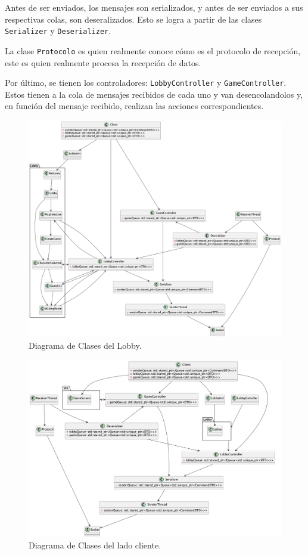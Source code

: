 \documentclass[titlepage,a4paper]{article}
\begin{document}
Antes de ser enviados, los mensajes son serializados, y antes de ser enviados a sus respectivas colas, son deseralizados. Esto se logra a partir de las clases \texttt{Serializer} y \texttt{Deserializer}.

La clase \texttt{Protocolo} es quien realmente conoce cómo es el protocolo de recepción, este es quien realmente procesa la recepción de datos. 

Por último, se tienen los controladores: \texttt{LobbyController} y \texttt{GameController}. Estos tienen a la cola de mensajes recibidos de cada uno y van desencolandolos y, en función del mensaje recibido, realizan las acciones correspondientes.

\begin{figure}[H]
  \centering
  \includegraphics[width=\textwidth]{images/Diagrama de Clases Lobby.png}
  \caption{Diagrama de Clases del Lobby.}
  \label{fig:lobby}
\end{figure}

\begin{figure}[H]
  \centering
  \includegraphics[width=\textwidth]{images/Client.png}
  \caption{Diagrama de Clases del lado cliente.}
  \label{fig:client}
\end{figure}
\end{document}
